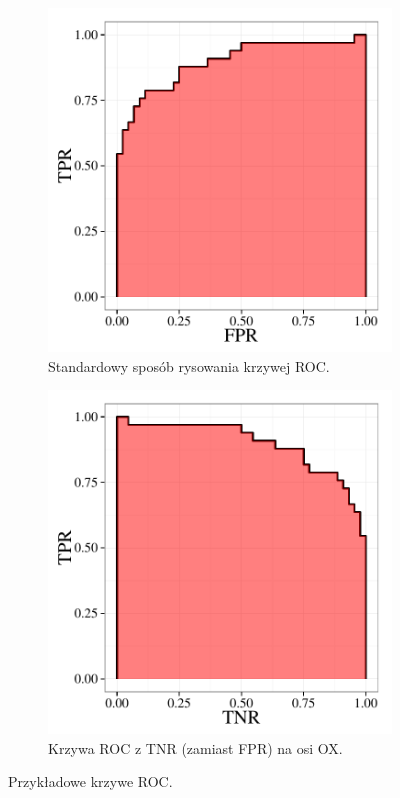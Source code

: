 \documentclass{mini}
\begin{document}
\begin{figure}[h]
  \begin{subfigure}[b]{0.4\textwidth}
    \includegraphics[width=\textwidth]{roc1.pdf}
    \caption{Standardowy sposób rysowania krzywej ROC.}
    \label{fig:f1}
  \end{subfigure}
  \hfill
  \begin{subfigure}[b]{0.4\textwidth}
    \includegraphics[width=\textwidth]{roc2.pdf}
    \caption{Krzywa ROC z TNR (zamiast FPR) na osi OX.}
    \label{fig:f2}
  \end{subfigure}
  \caption{Przykładowe krzywe ROC.}
  \label{krzyweroc}
\end{figure}
\end{document}
